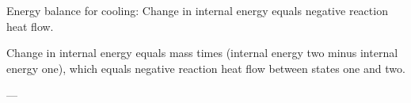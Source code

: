 Energy balance for cooling:  
Change in internal energy equals negative reaction heat flow.  

Change in internal energy equals mass times (internal energy two minus internal energy one), which equals negative reaction heat flow between states one and two.  

---